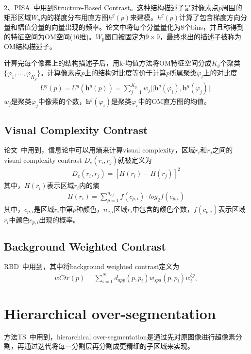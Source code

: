 \documentclass[12pt]{article}
\begin{document}
2、PISA~\cite{shi2013pisa}中用到Structure-Based Contrast。这种结构描述子是对像素点$p$周围的矩形区域$W_p$内的梯度分布用直方图$h^g(p)$来建模。$h^g(p)$计算了包含梯度方向分量和幅值分量的向量出现的频率。论文中将每个分量量化为8个bins，并且称得到的特征空间为OM空间(16维)。$W_p$窗口被固定为$9 \times 9$，最终求出的描述子被称为OM结构描述子。

计算完每个像素上的结构描述子后，用k-均值方法将OM特征空间分成$K_g$个聚类$\{\varphi_1,\ldots,\varphi_{K_g}\}$。计算像素点$p$上的结构对比度等价于计算$p$所属聚类$\varphi_i$上的对比度
\begin{align}
U^g(p) = U^g(\textbf{h}^g(p)) = \sum_{j=1}^{K_g} w_j||\textbf{h}^g(\varphi_i), \textbf{h}^g(\varphi_j)||
\end{align}
$w_j$是聚类$\varphi_j$中像素的个数，$\textbf{h}^g(\varphi_i)$是聚类$\varphi_i$中的OM直方图的均值。

\subsection{Visual Complexity Contrast}

论文~\cite{zhu2014tag}中用到，信息论中可以用熵来计算visual complexity，区域$r_i$和$r_j$之间的visual complexity contrast $D_e(r_i, r_j)$就被定义为
\begin{align}
D_e(r_i, r_j) = [H(r_i)-H(r_j)]^2
\end{align}
其中，$H(r_i)$表示区域$r_i$内的熵
\begin{align}
H(r_i) = \sum_{p=1}^{n_{c, i}}f(c_{p, i})\cdot log_2f(c_{p, i})
\end{align}
其中，$c_{p, i}$是区域$r_i$中第$p$种颜色，$n_{c, i}$区域$r_i$中包含的颜色个数，$f(c_{p, i})$表示区域$r_i$中颜色$c_{p, i}$出现的概率。

\subsection{Background Weighted Contrast}

RBD~\cite{zhu2014saliency}中用到，其中将background weighted contrast定义为
\begin{align}
wCtr(p) = \sum_{i=1}^{N}d_{app}(p, p_i)w_{spa}(p, p_i)w_i^{bg},
\end{align}

\section{Hierarchical over-segmentation}

方法TS~\cite{zhu2014tag}中用到，hierarchical over-segmentation是通过先对原图像进行超像素分割，再通过迭代将每一分割层再分割成更精细的子区域来实现。
\end{document}
